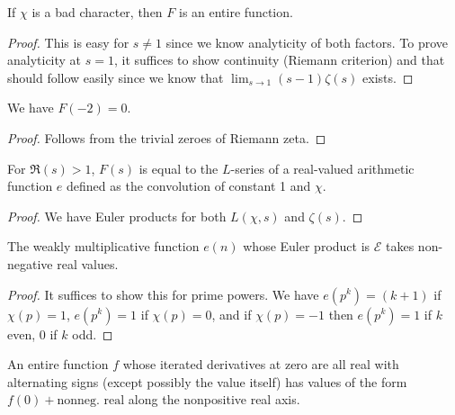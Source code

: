 \begin{lemma} \label{F_entire}
  \leanok
  If $\chi$ is a bad character, then $F$ is an entire function.
\end{lemma}

\begin{proof}
  \leanok
  This is easy for $s \ne 1$ since we know analyticity of both factors. To prove analyticity at $s = 1$, it suffices to show continuity (Riemann criterion) and that should follow easily since we know that $\lim_{s \to 1} (s - 1) \zeta(s)$ exists.
\end{proof}

\begin{lemma}
 \label{zero_of_F}
 \leanok
 We have $F(-2) = 0$.
\end{lemma}

\begin{proof}
 \leanok
 Follows from the trivial zeroes of Riemann zeta.
\end{proof}

\begin{lemma} \label{F_Euler_product}
  \leanok
  For $\Re(s) > 1$, $F(s)$ is equal to the $L$-series of a real-valued
  arithmetic function $e$ defined as the convolution of constant 1 and $\chi$.
\end{lemma}

\begin{proof}
  \leanok
  We have Euler products for both $L(\chi, s)$ and $\zeta(s)$.
\end{proof}

\begin{lemma}
  \label{nonneg_coeffs}
  \leanok
  The weakly multiplicative function $e(n)$ whose Euler product is $\mathcal{E}$ takes non-negative real values.
\end{lemma}

\begin{proof}
  \leanok
  It suffices to show this for prime powers. We have $e(p^k) = (k + 1)$ if $\chi(p) = 1$, $e(p^k) = 1$ if $\chi(p) = 0$, and if $\chi(p) = -1$ then $e(p^k) = 1$ if $k$ even, $0$ if $k$ odd.
\end{proof}

\begin{lemma} \label{positivity_from_derivs}
  \leanok
  An entire function $f$ whose iterated derivatives at zero are all real with alternating signs
  (except possibly the value itself) has values of the form $f(0) + \text{nonneg. real}$
  along the nonpositive real axis.
\end{lemma}

